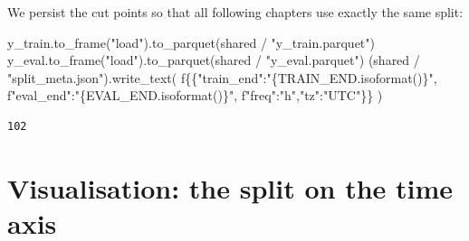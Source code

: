 \documentclass[
  english,
  letterpaper,
]{scrbook}
\newenvironment{Shaded}{\begin{snugshade}}{\end{snugshade}}
\newcommand{\CharTok}[1]{\textcolor[rgb]{0.13,0.47,0.30}{#1}}
\newcommand{\NormalTok}[1]{\textcolor[rgb]{0.00,0.23,0.31}{#1}}
\newcommand{\OperatorTok}[1]{\textcolor[rgb]{0.37,0.37,0.37}{#1}}
\newcommand{\SpecialCharTok}[1]{\textcolor[rgb]{0.37,0.37,0.37}{#1}}
\newcommand{\SpecialStringTok}[1]{\textcolor[rgb]{0.13,0.47,0.30}{#1}}
\newcommand{\StringTok}[1]{\textcolor[rgb]{0.13,0.47,0.30}{#1}}
\begin{document}
We persist the cut points so that all following chapters use exactly the
same split:

\begin{Shaded}
\begin{Highlighting}[]
\NormalTok{y\_train.to\_frame(}\StringTok{"load"}\NormalTok{).to\_parquet(shared }\OperatorTok{/} \StringTok{"y\_train.parquet"}\NormalTok{)}
\NormalTok{y\_eval.to\_frame(}\StringTok{"load"}\NormalTok{).to\_parquet(shared }\OperatorTok{/} \StringTok{"y\_eval.parquet"}\NormalTok{)}
\NormalTok{(shared }\OperatorTok{/} \StringTok{"split\_meta.json"}\NormalTok{).write\_text(}
    \SpecialStringTok{f\textquotesingle{}}\CharTok{\{\{}\SpecialStringTok{"train\_end":"}\SpecialCharTok{\{}\NormalTok{TRAIN\_END}\SpecialCharTok{.}\NormalTok{isoformat()}\SpecialCharTok{\}}\SpecialStringTok{",\textquotesingle{}}
    \SpecialStringTok{f\textquotesingle{}"eval\_end":"}\SpecialCharTok{\{}\NormalTok{EVAL\_END}\SpecialCharTok{.}\NormalTok{isoformat()}\SpecialCharTok{\}}\SpecialStringTok{",\textquotesingle{}}
    \SpecialStringTok{f\textquotesingle{}"freq":"h","tz":"UTC"}\CharTok{\}\}}\SpecialStringTok{\textquotesingle{}}
\NormalTok{)}
\end{Highlighting}
\end{Shaded}

\protect{}\label{persist-split}
\begin{verbatim}
102
\end{verbatim}

\section{Visualisation: the split on the time
axis}\label{visualisation-the-split-on-the-time-axis}
\end{document}
